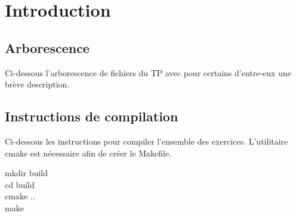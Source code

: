 \section{Introduction}

\subsection{Arborescence}
\noindent Ci-dessous l'arborescence de fichiers du TP avec pour certains d'entre-eux une brève description.


\subsection{Instructions de compilation}
Ci-dessous les instructions pour compiler l'ensemble des exercices. L'utilitaire cmake \cite{cite:cmake} est nécessaire afin de créer le Makefile.

\begin{mdframed}[backgroundcolor=lightblue, linecolor=darkblue]
	mkdir build\\
	cd build\\
	cmake ..\\
	make
\end{mdframed}


